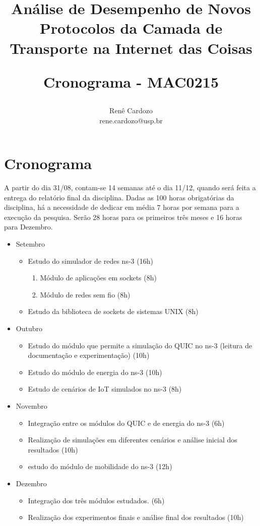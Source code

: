 \documentclass{article}
\author{Renê Cardozo \\ 
        rene.cardozo@usp.br}
\title{Análise de Desempenho de Novos Protocolos da Camada de Transporte na Internet das Coisas \\
\begin{Large} Cronograma - MAC0215 \end{Large}
}
\date{}
\begin{document}
\maketitle

\section*{Cronograma}
A partir do dia 31/08, contam-se 14 semanas até o dia 11/12, quando será feita a entrega do relatório final da
disciplina. Dadas as 100 horas obrigatórias da disciplina, há a necessidade de dedicar em média 7 horas por semana para
a execução da pesquisa. Serão 28 horas para os primeiros três meses e 16 horas para Dezembro.

\FloatBarrier

\begin{itemize}
\item Setembro
    \begin{itemize}
        \item Estudo do simulador de redes ns-3 (16h)
        \begin{enumerate}
            \item Módulo de aplicações em sockets (8h)
            \item Módulo de redes sem fio (8h)
        \end{enumerate}
        \item Estudo da biblioteca de sockets de sistemas UNIX (8h)
    \end{itemize}
\item Outubro
    \begin{itemize}
        \item Estudo do módulo que permite a simulação do QUIC no ns-3 (leitura de documentação e experimentação) (10h)
        \item Estudo do módulo de energia do ns-3 (10h)
        \item Estudo de cenários de IoT simulados no ns-3 (8h)
    \end{itemize}
\item Novembro
    \begin{itemize}
        \item Integração entre os módulos do QUIC e de energia do ns-3 (6h)
        \item Realização de simulações em diferentes cenários e análise inicial dos resultados (10h)
        \item estudo do módulo de mobilidade do ns-3 (12h)
    \end{itemize}
\item Dezembro
    \begin{itemize}
        \item Integração dos três módulos estudados. (6h)
        \item Realização dos experimentos finais e análise final dos resultados (10h)
    \end{itemize}
\end{itemize}
\end{document}
